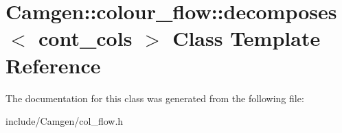 \hypertarget{a00127}{\section{Camgen\-:\-:colour\-\_\-flow\-:\-:decomposes$<$ cont\-\_\-cols $>$ Class Template Reference}
\label{a00127}
}


The documentation for this class was generated from the following file\-:\begin{DoxyCompactItemize}
\item 
include/\-Camgen/col\-\_\-flow.\-h\end{DoxyCompactItemize}
